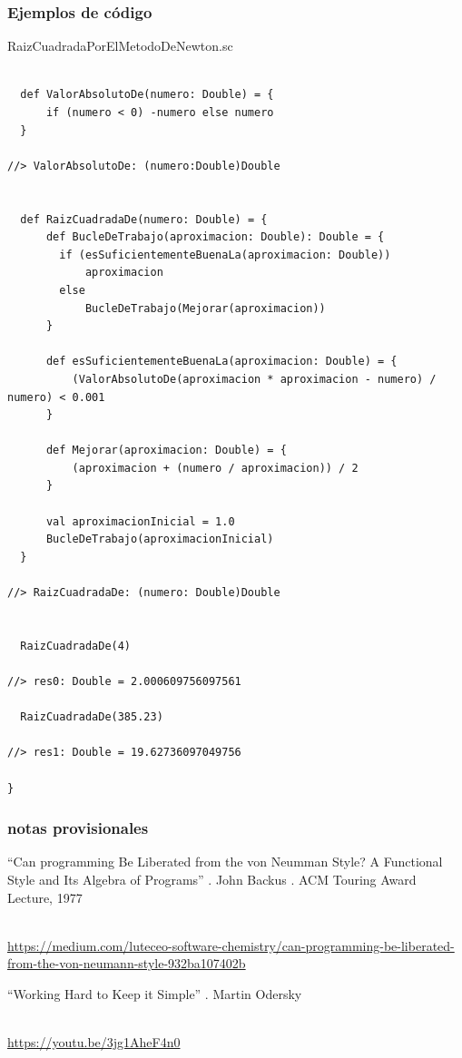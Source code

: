 \documentclass[spanish,12pt,a4paper,final,oneside]{book}
\begin{document}
\subsubsection*{Ejemplos de código}
RaizCuadradaPorElMetodoDeNewton.sc
\begin{lstlisting}[frame=single]

  def ValorAbsolutoDe(numero: Double) = {
      if (numero < 0) -numero else numero  
  }
  
//> ValorAbsolutoDe: (numero:Double)Double

    
  def RaizCuadradaDe(numero: Double) = {
      def BucleDeTrabajo(aproximacion: Double): Double = {
        if (esSuficientementeBuenaLa(aproximacion: Double)) 
            aproximacion
        else 
            BucleDeTrabajo(Mejorar(aproximacion))
      }
      
      def esSuficientementeBuenaLa(aproximacion: Double) = {
          (ValorAbsolutoDe(aproximacion * aproximacion - numero) / numero) < 0.001
      }
      
      def Mejorar(aproximacion: Double) = {
          (aproximacion + (numero / aproximacion)) / 2
      }
    
      val aproximacionInicial = 1.0
      BucleDeTrabajo(aproximacionInicial)
  }

//> RaizCuadradaDe: (numero: Double)Double

    
  RaizCuadradaDe(4)

//> res0: Double = 2.000609756097561

  RaizCuadradaDe(385.23)

//> res1: Double = 19.62736097049756

}
\end{lstlisting}

\subsubsection*{notas provisionales}
``Can programming Be Liberated from the von Neumman Style? A Functional Style and Its Algebra of Programs'' . John Backus . ACM Touring Award Lecture, 1977
\begin{tiny}
\\ \url{https://medium.com/luteceo-software-chemistry/can-programming-be-liberated-from-the-von-neumann-style-932ba107402b}
\end{tiny}


``Working Hard to Keep it Simple'' . Martin Odersky
\begin{tiny}
\\ \url{https://youtu.be/3jg1AheF4n0}
\end{tiny}
\end{document}
